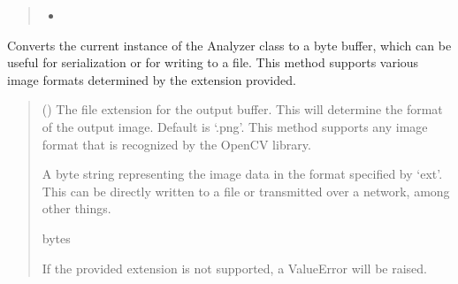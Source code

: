 \documentclass[letterpaper,10pt,english]{sphinxmanual}
\begin{document}
\begin{fulllineitems}
\begin{fulllineitems}
\begin{quote}
\begin{description}
\begin{itemize}
\item {} 
\sphinxAtStartPar
{}

\end{itemize}


\end{description}\end{quote}

\end{fulllineitems}


\begin{fulllineitems}
\label{\detokenize{forensicfit.core.analyzer:forensicfit.core.analyzer.Analyzer.to_buffer}}
\pysigstartsignatures
{}
\pysigstopsignatures
\sphinxAtStartPar
Converts the current instance of the Analyzer class to a byte buffer,
which can be useful for serialization or for writing to a file. This
method supports various image formats determined by the extension provided.
\begin{quote}\begin{description}
\sphinxAtStartPar
{}

\sphinxAtStartPar
{} (\sphinxstyleliteralemphasis{\sphinxupquote{, }}) \textendash{} The file extension for the output buffer. This will determine the
format of the output image. Default is ‘.png’. This method supports
any image format that is recognized by the OpenCV library.

\sphinxAtStartPar
A byte string representing the image data in the format specified
by ‘ext’. This can be directly written to a file or transmitted
over a network, among other things.

\sphinxAtStartPar
bytes

\sphinxAtStartPar
{} \textendash{} If the provided extension is not supported, a ValueError will be raised.

\end{description}\end{quote}


\end{fulllineitems}
\end{fulllineitems}
\end{document}
